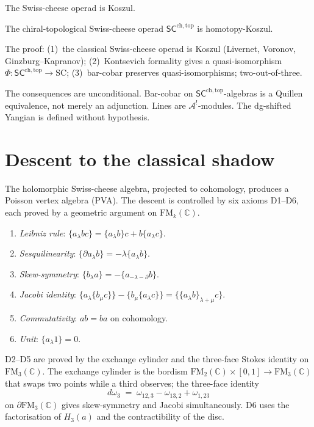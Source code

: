 \documentclass[11pt]{article}
\newcommand{\cA}{\mathcal{A}}
\newcommand{\C}{\mathbb{C}}
\newcommand{\SCchtop}{\mathsf{SC}^{\mathrm{ch,top}}}
\newcommand{\FM}{\mathrm{FM}}
\begin{document}
The Swiss-cheese operad is Koszul.

\begin{theorem}
\label{thm:homotopy-koszul-wn}
The chiral-topological Swiss-cheese operad $\SCchtop$ is
homotopy-Koszul.
\end{theorem}

\noindent
The proof:
(1)~the classical Swiss-cheese operad is Koszul
(Livernet, Voronov, Ginzburg--Kapranov);
(2)~Kontsevich formality gives a quasi-isomorphism
$\Phi\colon \SCchtop \to \mathrm{SC}$;
(3)~bar-cobar preserves quasi-isomorphisms; two-out-of-three.

The consequences are unconditional.  Bar-cobar on
$\SCchtop$-algebras is a Quillen equivalence, not merely an
adjunction.  Lines are $\cA^!$-modules.  The dg-shifted Yangian
is defined without hypothesis.


\section{Descent to the classical shadow}
\label{sec:pva-descent}

The holomorphic Swiss-cheese algebra, projected to cohomology,
produces a Poisson vertex algebra (PVA).  The descent is
controlled by six axioms D1--D6, each proved by a geometric
argument on $\FM_k(\C)$.

\begin{enumerate}[label=D\arabic*.,nosep]
\item \textit{Leibniz rule}:
  $\{a_\lambda bc\} = \{a_\lambda b\}c + b\{a_\lambda c\}$.
\item \textit{Sesquilinearity}:
  $\{\partial a_\lambda b\} = -\lambda\{a_\lambda b\}$.
\item \textit{Skew-symmetry}:
  $\{b_\lambda a\} = -\{a_{-\lambda-\partial} b\}$.
\item \textit{Jacobi identity}:
  $\{a_\lambda\{b_\mu c\}\} - \{b_\mu\{a_\lambda c\}\}
  = \{\{a_\lambda b\}_{\lambda+\mu} c\}$.
\item \textit{Commutativity}:
  $ab = ba$ on cohomology.
\item \textit{Unit}:
  $\{a_\lambda 1\} = 0$.
\end{enumerate}

D2--D5 are proved by the exchange cylinder and the three-face
Stokes identity on $\FM_3(\C)$.  The exchange cylinder is the
bordism
$\FM_2(\C) \times [0,1] \to \FM_3(\C)$
that swaps two points while a third observes; the three-face
identity
\[
d\omega_3 \;=\; \omega_{12,3} - \omega_{13,2} + \omega_{1,23}
\]
on $\partial\FM_3(\C)$ gives skew-symmetry and Jacobi
simultaneously.  D6 uses the factorisation of $H_3(a)$ and the
contractibility of the disc.
\end{document}

